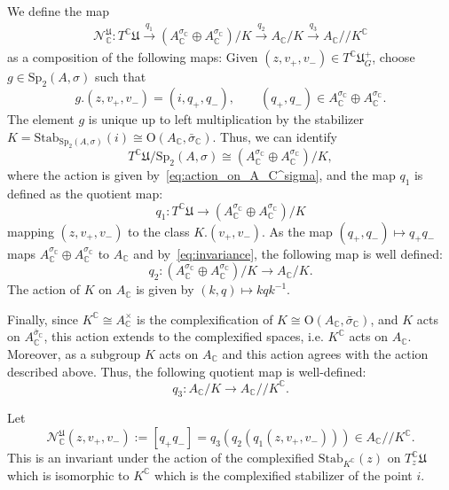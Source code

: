 \documentclass[oneside,11pt]{amsart}
\theoremstyle{definition}
\theoremstyle{remark}
\numberwithin{thm}{section}
\numberwithin{equation}{section}
\begin{document}
We define the map 
\begin{align*}
\mathcal N_\mathbb C^{\mathfrak U}\colon T^{\mathbb{C}}\mathfrak{U}\xrightarrow{q_1} (A_{\mathbb C}^{\sigma_{\mathbb C}}\oplus A_{\mathbb C}^{\sigma_{\mathbb C}})/K  \xrightarrow{q_2} A_\mathbb C/K  \xrightarrow{q_3}A_\mathbb C/\!\!/K^\mathbb C
\end{align*}
as a composition of the following maps: Given $(z,v_+,v_-)\in T^{\mathbb C}\mathfrak U_G^+$,
choose $g\in\mathrm{Sp}_2(A,\sigma)$ such that 
\[
g.(z,v_+,v_-)=(i,q_+,q_-),\qquad (q_+,q_-)\in A_{\mathbb C}^{\sigma_{\mathbb C}}
\oplus A_{\mathbb C}^{\sigma_{\mathbb C}}.
\]
The element $g$ is unique up to left multiplication by the stabilizer $K=\mathrm{Stab}_{\mathrm{Sp}_2(A,\sigma)}(i)\cong \mathrm{O}(A_{\mathbb C},\bar\sigma_{\mathbb C})$. Thus, we can identify 
$$
T^{\mathbb{C}}\mathfrak{U}/\mathrm{Sp}_2(A,\sigma)\cong (A_{\mathbb C}^{\sigma_{\mathbb C}}\oplus A_{\mathbb C}^{\sigma_{\mathbb C}})/K,$$
where the action is given by~\eqref{eq:action_on_A_C^sigma}, and the map $q_1$ is defined as the quotient map:
$$
q_1\colon T^{\mathbb{C}}\mathfrak{U}\to (A_{\mathbb C}^{\sigma_{\mathbb C}}\oplus A_{\mathbb C}^{\sigma_{\mathbb C}})/K
$$
mapping $(z,v_+,v_-)$ to the class $K.(v_+,v_-)$. As the map $(q_+,q_-)\mapsto q_+q_-$ maps $A_{\mathbb C}^{\sigma_{\mathbb C}}\oplus A_{\mathbb C}^{\sigma_{\mathbb C}}$ to $A_\mathbb{C}$ and by~\eqref{eq:invariance}, the following map is well defined:
$$
q_2\colon (A_{\mathbb C}^{\sigma_{\mathbb C}}\oplus A_{\mathbb C}^{\sigma_{\mathbb C}})/K\to A_\mathbb{C}/K.
$$
The action of $K$ on $A_\mathbb{C}$ is given by $(k,q)\mapsto kqk^{-1}$. 

Finally, since $K^{\mathbb{C}}\cong A_{\mathbb{C}}^\times$ is the complexification of $K\cong\mathrm{O}(A_{\mathbb C},\bar\sigma_{\mathbb C})$, and $K$ acts on $A_\mathbb{C}^{\bar\sigma_{\mathbb C}}$, this action extends to the complexified spaces, i.e. $K^{\mathbb C}$ acts on $A_\mathbb{C}$. Moreover, as a subgroup $K$ acts on $A_\mathbb{C}$ and this action agrees with the action described above. Thus, the following quotient map is well-defined: 
$$q_3\colon A_\mathbb{C}/K\longrightarrow A_\mathbb{C}/\!\!/K^{\mathbb C}.$$

Let 
$$
\mathcal N^{\mathfrak U}_\mathbb C(z,v_+,v_-):=[q_+q_-]=q_3(q_2(q_1(z,v_+,v_-)))\in A_\mathbb{C}/\!\!/K^{\mathbb C}.
$$ 
This is an invariant under the action of the complexified 
$\mathrm{Stab}_{K^\mathbb C}(z)$ on $T_z^{\mathbb{C}}\mathfrak{U}$ which is isomorphic to $K^\mathbb C$ which is the complexified stabilizer of the point $i$.
\end{document}
